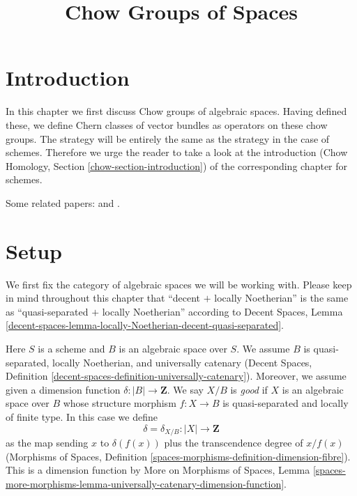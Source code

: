 

%


\title{Chow Groups of Spaces}

\maketitle

\label{section-phantom}


\tableofcontents


\section{Introduction}
\label{section-introduction}

\noindent
In this chapter we first discuss Chow groups of algebraic spaces.
Having defined these, we define Chern classes of vector bundles as
operators on these chow groups. The strategy will be entirely
the same as the strategy in the case of schemes. Therefore we
urge the reader to take a look at the introduction
(Chow Homology, Section \ref{chow-section-introduction})
of the corresponding chapter for schemes.

\medskip\noindent
Some related papers: \cite{edidin-graham} and \cite{kresch_cycle}.



\section{Setup}
\label{section-setup}

\noindent
We first fix the category of algebraic spaces we will be working with.
Please keep in mind throughout this chapter that
``decent $+$ locally Noetherian'' is the same as
``quasi-separated $+$ locally Noetherian'' according to
Decent Spaces, Lemma
\ref{decent-spaces-lemma-locally-Noetherian-decent-quasi-separated}.

\begin{situation}
\label{situation-setup}
Here $S$ is a scheme and $B$ is an algebraic space over $S$.
We assume $B$ is quasi-separated, locally Noetherian, and
universally catenary (Decent Spaces, Definition
\ref{decent-spaces-definition-universally-catenary}).
Moreover, we assume given a dimension function
$\delta : |B| \longrightarrow \mathbf{Z}$.
We say $X/B$ is {\it good} if $X$ is an algebraic space
over $B$ whose structure morphism $f : X \to B$ is
quasi-separated and locally of finite type.
In this case we define
$$
\delta = \delta_{X/B} : |X| \longrightarrow \mathbf{Z}
$$
as the map sending $x$ to $\delta(f(x))$ plus the transcendence degree
of $x/f(x)$ (Morphisms of Spaces, Definition
\ref{spaces-morphisms-definition-dimension-fibre}).
This is a dimension function by
More on Morphisms of Spaces, Lemma
\ref{spaces-more-morphisms-lemma-universally-catenary-dimension-function}.
\end{situation}

